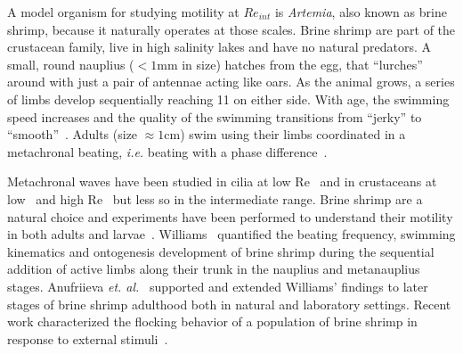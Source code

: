 \documentclass[%
 onecolumn,
superscriptaddress,
 amsmath,amssymb,
 aps,
longbibliography
]{revtex4-2}
\begin{document}
A model organism for studying motility at $Re_{int}$ is \textit{Artemia}, also known as brine shrimp, because it naturally operates at those scales.  Brine shrimp are part of the crustacean
family, live in high salinity lakes and have no natural
predators. A small, round nauplius ($<1$mm in size) hatches from the
egg, that “lurches” around with just a pair of antennae acting like
oars. As the animal grows, a series of limbs develop
sequentially reaching 11 on either side. 
With age, the swimming speed increases and the
quality of the swimming transitions from “jerky” to
“smooth”~\cite{Williams1994AModel,Anufriieva2014TheSwimmingBehavior}. Adults (size $\approx 1$cm) swim using their limbs
coordinated in a metachronal beating, \textit{i.e.} beating with a phase difference~\cite{Williams1994AModel}. 

Metachronal
waves have been studied in cilia at low Re~\cite{Elgeti2013,brumley2012,brumley2015,Hayashi2020Metachronal} and in crustaceans
at low~\cite{Takagi2015Swimming,Hayashi2020Metachronal} and high Re~\cite{Alben2010Coordination,Murphy2011Metachronal} but less so in the intermediate range. Brine shrimp are a natural choice and experiments have been performed to understand their motility in both adults and larvae~\cite{Williams1994AModel, Williams1994Locomotion, Gauld1959Swimming, Anufriieva2014TheSwimmingBehavior}. Williams~\cite{Williams1994Locomotion} quantified the beating frequency, swimming kinematics and ontogenesis development of brine shrimp during the sequential addition of active limbs along their trunk in the nauplius and metanauplius stages. Anufriieva \textit{et. al.}~\cite{Anufriieva2014TheSwimmingBehavior} supported and extended Williams' findings to later stages of brine shrimp adulthood both in natural and laboratory settings. Recent work characterized the flocking behavior of a population of brine shrimp in response to external stimuli~\cite{Ali2011Complexity, Gulbrandsen2001ArtemiaSwarming}.
\end{document}
